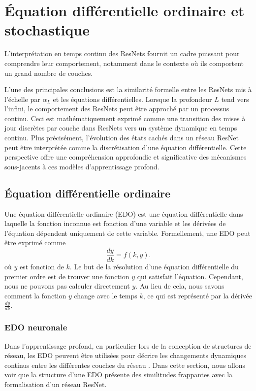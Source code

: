 \chapter{Équation différentielle ordinaire et stochastique}
L'interprétation en temps continu des ResNets fournit un cadre puissant pour comprendre leur comportement, notamment dans le contexte où ils comportent un grand nombre de couches.

L'une des principales conclusions est la similarité formelle entre les ResNets mis à l'échelle par $ \alpha _L $  et les équations différentielles. Lorsque la profondeur \(L\) tend vers l'infini, le comportement des ResNets peut être approché par un processus continu. Ceci est mathématiquement exprimé comme une transition des mises à jour discrètes par couche dans ResNets vers un système dynamique en temps continu. Plus précisément, l'évolution des états cachés dans un réseau ResNet peut être interprétée comme la discrétisation d'une équation différentielle. Cette perspective offre une compréhension approfondie et significative des mécanismes sous-jacents à ces modèles d'apprentissage profond.


\section{Équation différentielle ordinaire}
Une équation différentielle ordinaire (EDO) est une équation différentielle dans laquelle la fonction inconnue est fonction d'une variable et les dérivées de l'équation dépendent uniquement de cette variable. Formellement, une EDO peut être exprimé comme
\[
    \frac{dy}{dk}=f(k,y)
.\]
où $y$ est fonction de $k$. Le but de la résolution d'une équation différentielle du premier ordre est de trouver une fonction $y$ qui satisfait l'équation. Cependant, nous ne pouvons pas calculer directement $y$. Au lieu de cela, nous savons comment la fonction $y$ change avec le temps $k$, ce qui est représenté par la dérivée $\frac{dy}{dk}$.

\subsection{EDO neuronale}
Dans l'apprentissage profond, en particulier lors de la conception de structures de réseau, les EDO peuvent être utilisées pour décrire les changements dynamiques continus entre les différentes couches du réseau . Dans cette section, nous allons voir que la structure d'une EDO présente des similitudes frappantes avec la formalisation d'un réseau ResNet. 

